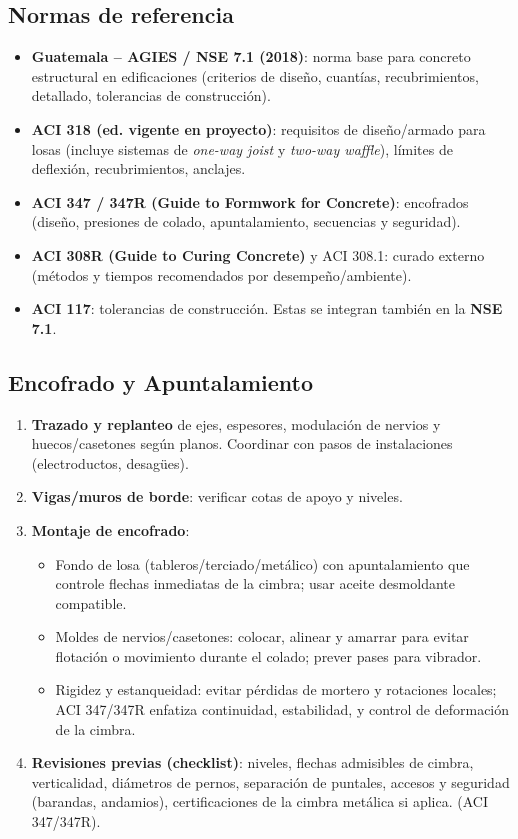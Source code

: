 \documentclass[12pt,a4paper]{article}
\begin{document}
	\subsection{Normas de referencia}
	\begin{itemize}
		\item \textbf{Guatemala – AGIES / NSE 7.1 (2018)}: norma base para concreto estructural en edificaciones (criterios de diseño, cuantías, recubrimientos, detallado, tolerancias de construcción).
		\item \textbf{ACI 318 (ed. vigente en proyecto)}: requisitos de diseño/armado para losas (incluye sistemas de \textit{one-way joist} y \textit{two-way waffle}), límites de deflexión, recubrimientos, anclajes.
		\item \textbf{ACI 347 / 347R (Guide to Formwork for Concrete)}: encofrados (diseño, presiones de colado, apuntalamiento, secuencias y seguridad).
		\item \textbf{ACI 308R (Guide to Curing Concrete)} y ACI 308.1: curado externo (métodos y tiempos recomendados por desempeño/ambiente).
		\item \textbf{ACI 117}: tolerancias de construcción. Estas se integran también en la \textbf{NSE 7.1}.
	\end{itemize}
	

	
	\subsection{ Encofrado y Apuntalamiento}
	\begin{enumerate}
		\item \textbf{Trazado y replanteo} de ejes, espesores, modulación de nervios y huecos/casetones según planos. Coordinar con pasos de instalaciones (electroductos, desagües).
		\item \textbf{Vigas/muros de borde}: verificar cotas de apoyo y niveles.
		\item \textbf{Montaje de encofrado}: 
		\begin{itemize}
			\item Fondo de losa (tableros/terciado/metálico) con apuntalamiento que controle flechas inmediatas de la cimbra; usar aceite desmoldante compatible.
			\item Moldes de nervios/casetones: colocar, alinear y amarrar para evitar flotación o movimiento durante el colado; prever pases para vibrador.
			\item Rigidez y estanqueidad: evitar pérdidas de mortero y rotaciones locales; ACI 347/347R enfatiza continuidad, estabilidad, y control de deformación de la cimbra.
		\end{itemize}
		\item \textbf{Revisiones previas (checklist)}: niveles, flechas admisibles de cimbra, verticalidad, diámetros de pernos, separación de puntales, accesos y seguridad (barandas, andamios), certificaciones de la cimbra metálica si aplica. (ACI 347/347R).
	\end{enumerate}
	
\end{document}
